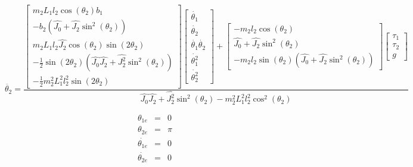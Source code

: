 \begin{equation}
\ddot{\theta_2} =
\frac{
\begin{bmatrix}
m_2L_1l_2\cos(\theta_2)b_1 \\ 
-b_2(\hat{J_0}+\hat{J_2}\sin^2(\theta_2)) \\ 
m_2L_1l_2\hat{J_2}\cos(\theta_2)\sin(2\theta_2) \\ 
-\frac{1}{2}\sin(2\theta_2)(\hat{J_0}\hat{J_2}+\hat{J^2_2}\sin^2(\theta_2)) \\ 
-\frac{1}{2}m^2_2L^2_1l^2_2\sin(2\theta_2)
\end{bmatrix}
\begin{bmatrix}
\dot{\theta_1} \\ 
\dot{\theta_2} \\ 
\dot{\theta_1}\dot{\theta_2} \\ 
\dot{\theta^2_1} \\ 
\dot{\theta^2_2}
\end{bmatrix}
+
\begin{bmatrix}
-m_2l_2\cos(\theta_2) \\ 
\hat{J_0}+\hat{J_2}\sin^2(\theta_2) \\ 
-m_2l_2\sin(\theta_2)(\hat{J_0}+\hat{J_2}\sin^2(\theta_2))
\end{bmatrix}
\begin{bmatrix}
\tau_1 \\ 
\tau_2 \\ 
g
\end{bmatrix} }
{\hat{J_0}\hat{J_2}+\hat{J^2_2}\sin^2(\theta_2)-m^2_2L^2_1l^2_2\cos^2(\theta_2)}
\end{equation}

\begin{eqnarray}
\theta_{1e} &=& 0		\nonumber \\
\theta_{2e} &=& \pi	\nonumber \\
\dot{\theta_{1e}} &=& 0		\nonumber \\
\dot{\theta_{2e}} &=& 0	
\end{eqnarray}

\begin{equation}
\end{equation}

\begin{equation}
\end{equation}

\begin{equation}
\end{equation}

\begin{equation}
\end{equation}

\begin{equation}
\end{equation}

\begin{equation}
\end{equation}

\begin{equation}
\end{equation}

\begin{equation}
\end{equation}

\begin{equation}
\end{equation}
